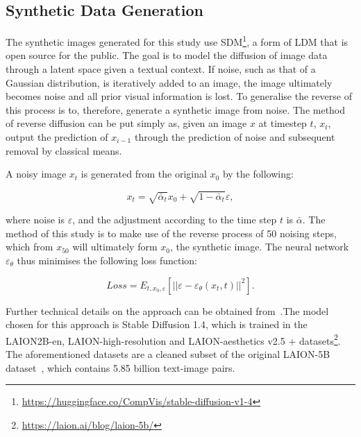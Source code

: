 \documentclass{article}
\begin{document}
\subsection{Synthetic Data Generation}
\label{subsec:synth}
The synthetic images generated for this study use SDM\footnote{\url{https://huggingface.co/CompVis/stable-diffusion-v1-4}}, a form of LDM that is open source for the public. The goal is to model the diffusion of image data through a latent space given a textual context. If noise, such as that of a Gaussian distribution, is iteratively added to an image, the image ultimately becomes noise and all prior visual information is lost. To generalise the reverse of this process is to, therefore, generate a synthetic image from noise. The method of reverse diffusion can be put simply as, given an image $x$ at timestep $t$, $x_t$, output the prediction of $x_{i-1}$ through the prediction of noise and subsequent removal by classical means. 

A noisy image $x_t$ is generated from the original $x_0$ by the following:

\begin{equation}
    \label{eq:noise}
    x_t=\sqrt{\bar{\alpha}_t} x_0+\sqrt{1-\bar{\alpha}_t} \varepsilon,
\end{equation}

\noindent where noise is $\varepsilon$, and the adjustment according to the time step $t$ is $\bar{\alpha}$. 
The method of this study is to make use of the reverse process of 50 noising steps, which from $x_{50}$ will ultimately form $x_0$, the synthetic image. The neural network $\varepsilon_\theta$ thus minimises the following loss function:

\begin{equation}
Loss = E_{t, x_0, \varepsilon} \left[ \left| \left| \varepsilon - \varepsilon_\theta(x_t, t) \right| \right| ^2 \right].
\end{equation}

Further technical details on the approach can be obtained from~\cite{rombach2022high}.The model chosen for this approach is Stable Diffusion 1.4, which is trained in the LAION2B-en, LAION-high-resolution and LAION-aesthetics v2.5 + datasets\footnote{\url{https://laion.ai/blog/laion-5b/}}. The aforementioned datasets are a cleaned subset of the original LAION-5B dataset~\cite{schuhmann2022laion}, which contains 5.85 billion text-image pairs. 
\end{document}
